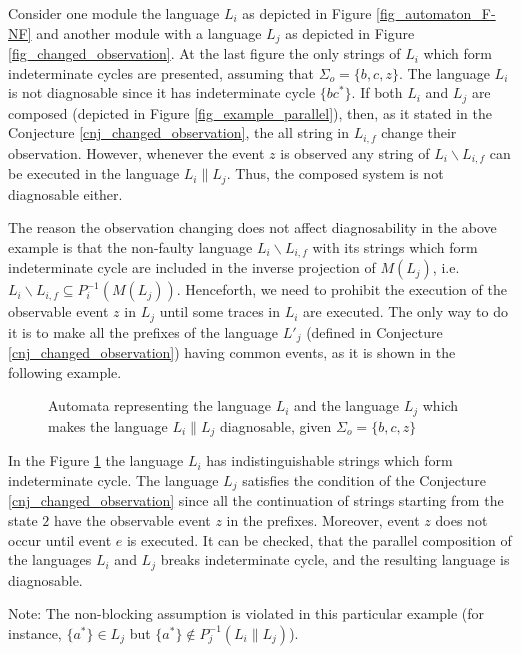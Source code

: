 \documentclass[a4paper, 10pt, conference]{ieeeconf} \IEEEoverridecommandlockouts
\begin{document}
\begin{example} Consider one module the language $L_i$ as depicted in
Figure \ref{fig_automaton_F-NF} and another module with a language $L_j$ as
depicted in Figure \ref{fig_changed_observation}. At the last figure the
only strings of $L_i$ which form indeterminate cycles are presented, assuming that 
$\Sigma_o = \{b, c, z\}$. The language $L_i$ is not diagnosable since it has
indeterminate cycle $\{bc^*\}$. If both $L_i$ and $L_j$ are composed
(depicted in Figure \ref{fig_example_parallel}), then, as it
stated in the Conjecture \ref{cnj_changed_observation}, the all string in
$L_{i,f}$ change their observation.
However, whenever the event $z$ is observed any string of $L_i\backslash
L_{i,f}$ can be executed in the language $L_i \parallel L_j$.
Thus, the composed system is not diagnosable either.
\end{example}

The reason the observation changing does not affect diagnosability in the
above example is that the non-faulty language $L_i\backslash L_{i,f}$ with its 
strings which form indeterminate cycle are included in the inverse projection of
$M(L_j)$, i.e.
$
L_i\backslash L_{i,f} \subseteq P_i^{-1}(M(L_j)).
$
Henceforth, we need to prohibit the execution of the observable event $z$
in $L_j$ until some traces in $L_i$ are executed. The only way to do it is to
make all the prefixes of the language $L'_j$ (defined in Conjecture
\ref{cnj_changed_observation}) having common events, as it is shown in the
following example.

\begin{figure}[t]
\centering

\caption{Automata representing the language $L_i$ and the language $L_j$ which
makes the language $L_i \parallel L_j$ diagnosable, given 
$\Sigma_o = \{b, c, z\}$}
\label{fig_changed_observation2}
\end{figure}

\begin{example} In the Figure \ref{fig_changed_observation2} the language $L_i$
has indistinguishable strings which form indeterminate cycle. The language
$L_j$ satisfies the condition of the Conjecture \ref{cnj_changed_observation}
since all the continuation of strings starting from the state $2$ have the
observable event $z$ in the prefixes. Moreover, event $z$ does not occur until 
event $e$ is executed. It can be checked, that the parallel composition of the
languages $L_i$ and $L_j$ breaks indeterminate cycle, and the resulting
language is diagnosable.

Note: The non-blocking assumption is violated in this particular example (for
instance, 
$\{a^*\} \in L_j$ but $\{a^*\} \not \in P^{-1}_j(L_i \parallel L_j)$).
\end{example}
\end{document}
